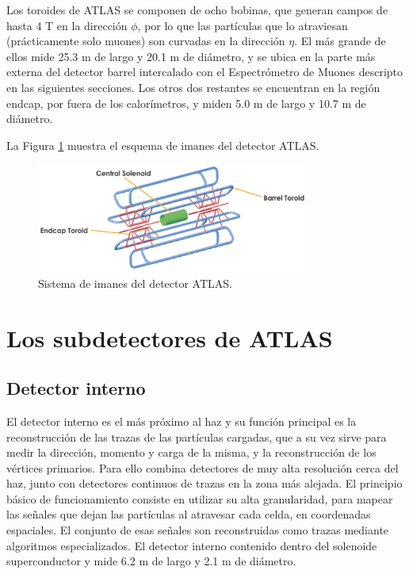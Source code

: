 Los toroides de ATLAS se componen de ocho bobinas, que generan campos de hasta 4 T 
en la dirección $\phi$, por lo que las partículas que lo atraviesan (prácticamente solo muones) son curvadas en la dirección $\eta$. El más grande de ellos mide 25.3 m de largo y 20.1 m de diámetro, y se ubica en la parte más externa del detector barrel intercalado con el Espectrómetro de Muones descripto en las siguientes secciones. Los otros dos restantes se encuentran en la región endcap, por fuera de los calorímetros, y miden 5.0 m de largo y 10.7 m de diámetro. 

La Figura \ref{magnet_1} muestra el esquema de imanes del detector ATLAS.

\begin{figure}
\centering
  \includegraphics[width=0.8\textwidth]{images/magnet_1.png}
  \caption{Sistema de imanes del detector ATLAS.}
  \label{magnet_1}
\end{figure}


\section{Los subdetectores de ATLAS}

\subsection{Detector interno}

El detector interno es el más próximo al haz y su función principal es la reconstrucción de las trazas de las partículas cargadas, que a su vez sirve para medir la dirección, momento y carga de la misma, y la reconstrucción de los vértices primarios. Para ello combina detectores de muy alta resolución cerca del haz, junto con detectores continuos de trazas en la zona más alejada. El principio básico de funcionamiento consiste en utilizar su alta granularidad, para mapear las señales que dejan las partículas al atravesar cada celda, en coordenadas espaciales. El conjunto de esas señales son reconstruidas como trazas mediante algoritmos especializados. El detector interno contenido dentro del solenoide superconductor y mide 6.2 m de largo y 2.1 m de diámetro. 

